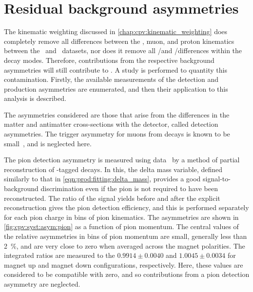 \begin{table}
  \centering
  \caption{%
    Differences between asymmetries measured with the nominal fit method and 
    the sideband subtraction, measured for each data sub-sample and combination 
    of sub-samples.
    The uncertainties quoted assume the values found by the two methods are 
    fully correlated.
    The computation of the combinations, ``2011 + 2012'' and ``Average'', is 
    defined in \cref{chap:cpv:results:combination}.
  }
  \label{tab:syst:sbs_differences}
  
\end{table}

\section{Residual background asymmetries}
\label{chap:cpv:syst:asym}

The kinematic weighting discussed in \cref{chap:cpv:kinematic_weighting} does 
completely remove all differences between the \PLambdab, muon, and proton 
kinematics between the \pKK\ and \ppipi\ datasets, nor does it remove all 
\PKminus/\PKplus and \Ppiminus/\Ppiplus differences within the decay modes.
Therefore, contributions from the respective background asymmetries will still 
contribute to \dACP\@.
A study is performed to quantity this contamination.
Firstly, the available measurements of the detection and production asymmetries 
are enumerated, and then their application to this analysis is described.

The asymmetries considered are those that arise from the differences in the 
matter and antimatter cross-sections with the detector, called detection 
asymmetries.
The trigger asymmetry for muons from \PB decays is known to be 
small~\cite{Aaij:2016yze}, and is neglected here.

The pion detection asymmetry is measured using  
data~\cite{Aaij:2012cy} by a method of partial reconstruction of 
\PDstarp-tagged \decay{\PDzero}{\PKminus\Ppiplus\Ppiminus\Ppiplus} decays.
In this, the delta mass variable, defined similarly to that in 
\cref{eqn:prod:fitting:delta_mass}, provides a good signal-to-background 
discrimination even if the pion is not required to have been reconstructed.
The ratio of the signal yields before and after the explicit reconstruction 
gives the pion detection efficiency, and this is performed separately for each 
pion charge in bins of pion kinematics.
The asymmetries are shown in \cref{fig:cpv:syst:asym:pion} as a function of 
pion momentum.
The central values of the relative asymmetries in bins of pion momentum are 
small, generally less than \SI{2}{\percent}, and are very close to zero when 
averaged across the magnet polarities.
The integrated ratios are measured to the $0.9914 \pm 0.0040$ and $1.0045 \pm 
0.0034$ for magnet up and magnet down configurations, respectively.
Here, these values are considered to be compatible with zero, and so 
contributions from a pion detection asymmetry are neglected.

